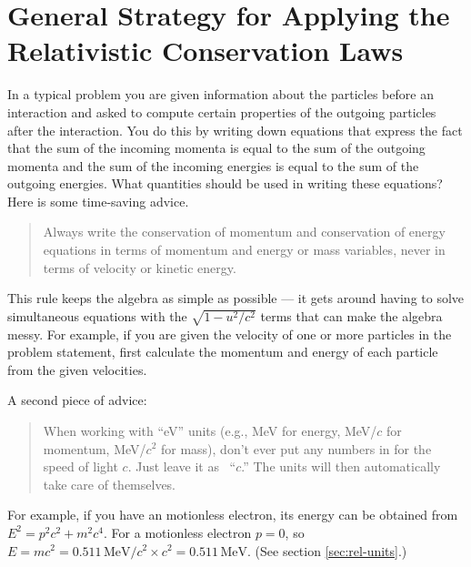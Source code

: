 \section{General Strategy for 
Applying the Relativistic Conservation Laws}


 In a typical problem you are given information about the particles
before an interaction and asked to compute certain properties of the
outgoing particles after the interaction.  You do this by writing down
equations that express the fact that the sum of the incoming momenta
is equal to the sum of the outgoing momenta and the sum of the
incoming energies is equal to the sum of the outgoing energies.  What
quantities should be used in writing these equations?  Here is some
time-saving advice.
\begin{quote}
Always write the conservation of momentum and conservation of energy
equations in terms of momentum and energy or mass variables, never in
terms of velocity or kinetic energy.
\end{quote}

This rule keeps the algebra as simple as possible --- it gets around
having to solve simultaneous equations with the $\sqrt{1-u^2/c^2}$
terms that can make the algebra messy.  For example, if you are given
the velocity of one or more particles in the problem statement, first
calculate the momentum and energy of each particle from the given
velocities.

A second piece of advice:
\begin{quote}
When working with ``eV'' units (e.g., MeV for energy, MeV/$c$ for
momentum, MeV/$c^2$ for mass), don't ever put any numbers in for the
speed of light $c$.  Just leave it as ~``$c$.''  The units will then
automatically take care of themselves.
\end{quote}

For example, if you have an motionless electron, its energy can be
obtained from $E^2 = p^2c^2+m^2c^4$. For a motionless electron  $p = 0$, 
so $E= mc^2 = 0.511\,\text{MeV}/c^2\times c^2 = 0.511\,\text{MeV}$.  
(See section \ref{sec:rel-units}.)


